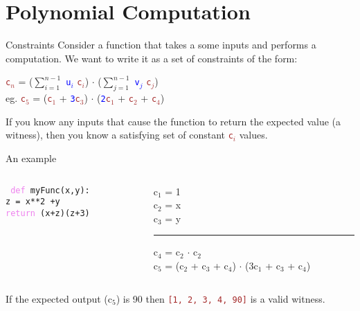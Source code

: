 \documentclass[dvipsnames]{beamer}
\newcommand{\pub}[1]{\textcolor{blue}{\texttt{#1}}}
\newcommand{\priv}[1]{\textcolor{brown}{\texttt{#1}}}
\newcommand{\code}[1]{\texttt{#1}}
\newcommand{\keyword}[1]{\textcolor{Violet}{\texttt{#1}}}
\begin{document}
    \section{Polynomial Computation}

    \begin{frame}{Constraints}
        Consider a function that takes a some inputs and performs a computation. We want to write it as a set of constraints of the form:\\

        \begin{center}
            \priv{c$_n$} = ($\sum_{i=1}^{n-1}$ \pub{u$_i$} \priv{c$_i$}) $\cdot$ ($\sum_{j=1}^{n-1}$ \pub{v$_j$} \priv{c$_j$})\\
            \vspace{0.5cm}
            eg. \priv{c$_5$} = (\priv{c$_1$} + \pub{3}\priv{c$_3$}) $\cdot$ (\pub{2}\priv{c$_1$} + \priv{c$_2$} + \priv{c$_4$})
        \end{center}

        If you know any inputs that cause the function to return the expected value (a witness), then you know a satisfying set of constant \priv{c$_i$} values.
    \end{frame}

    \begin{frame}{An example}
        \begin{columns}
            \begin{column}{0.4\textwidth}
                \code{
                \keyword{def} myFunc(x,y):\\
                \hspace{0.5cm}z = x**2 +y\\
                \hspace{0.5cm}\keyword{return} (x+z)(z+3)
                }
            \end{column}
            \begin{column}{0.6\textwidth}
                c$_1$ = 1\\
                c$_2$ = x\\
                c$_3$ = y\\
                \vspace{0.3cm}
                \hrule
                \vspace{0.3cm}
                c$_4$ = c$_2$ $\cdot$ c$_2$\\
                c$_5$ = (c$_2$ + c$_3$ + c$_4$) $\cdot$ (3c$_1$ + c$_3$ + c$_4$)\\
            \end{column}
        \end{columns}

        \vspace{1cm}
        If the expected output (c$_5$) is 90 then \priv{[1, 2, 3, 4, 90]} is a valid witness.
    \end{frame}
\end{document}
